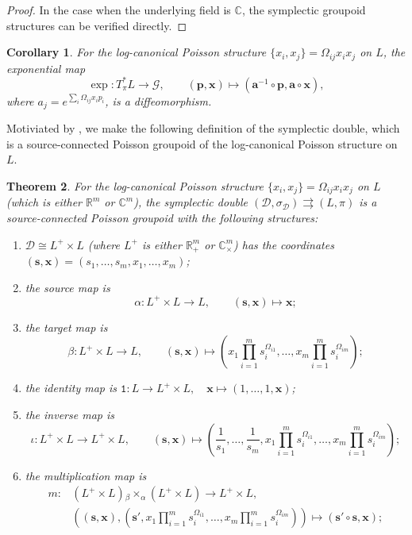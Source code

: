 \documentclass{amsart}
\newtheorem{theorem}{Theorem}[section]
\newtheorem{corollary}[theorem]{Corollary}
\numberwithin{equation}{section}
\newcommand{\bfa}{{\boldsymbol{a}}}
\newcommand{\bfp}{{\boldsymbol{p}}}
\newcommand{\bfs}{{\boldsymbol{s}}}
\newcommand{\bfx}{{\boldsymbol{x}}}
\newcommand{\cD}{\mathcal{D}}
\newcommand{\cG}{\mathcal{G}}
\newcommand{\CC}{\mathbb{C}}
\newcommand{\RR}{\mathbb{R}}
\newcommand{\rra}{\rightrightarrows}
\begin{document}
\begin{proof}
  In the case when the underlying field is $\CC$, the symplectic groupoid structures can be verified directly.
\end{proof}

\begin{corollary}
  For the log-canonical Poisson structure $\{x_i, x_j\} = \Omega_{ij} x_i x_j$ on $L$, the exponential map
  \[\exp: T^*_\pi L \to \cG, \qquad (\bfp, \bfx) \mapsto \left(\bfa^{-1} \circ \bfp, \bfa \circ \bfx \right),\]
  where $a_j = e^{\sum_i \Omega_{ij} x_ip_i}$, is a diffeomorphism.
\end{corollary}

Motiviated by \cite{FG09c}, we make the following definition of the symplectic double, which is a source-connected Poisson groupoid of the log-canonical Poisson structure on $L$.
\begin{theorem} \label{thm:SymDBLoc}
  \cite{FG09c}
  For the log-canonical Poisson structure $\{x_i, x_j\} = \Omega_{ij} x_i x_j$ on $L$ (which is either $\RR^m$ or $\CC^m$), the \emph{symplectic double} $(\cD, \sigma_\cD) \rra (L, \pi)$ is a source-connected Poisson groupoid with the following structures:
  \begin{enumerate}
    \item $\cD \cong L^+ \times L$ (where $L^+$ is either $\RR_+^m$ or $\CC_\times^m$) has the coordinates $(\bfs, \bfx) = (s_1, \ldots, s_m, x_1, \ldots, x_m)$;
    \item the source map is
      \[\alpha: L^+ \times L \to L, \qquad (\bfs, \bfx) \mapsto \bfx;\]
    \item the target map is
      \[\beta: L^+ \times L \to L, \qquad (\bfs, \bfx) \mapsto \left(x_1 \prod_{i=1}^m s_i^{\Omega_{i1}}, \ldots, x_m \prod_{i=1}^m s_i^{\Omega_{im}}\right);\]
    \item the identity map is $\mathtt{1}: L \to L^+ \times L, \quad \bfx \mapsto (1, \ldots, 1, \bfx)$;
    \item the inverse map is
      \[\iota: L^+ \times L \to L^+ \times L, \qquad (\bfs, \bfx) \mapsto \left(\frac{1}{s_1}, \ldots, \frac{1}{s_m}, x_1 \prod_{i=1}^m s_i^{\Omega_{i1}}, \ldots, x_m \prod_{i=1}^m s_i^{\Omega_{im}}\right);\]
    \item the multiplication map is
      \[\begin{aligned}
	  m: & \left(L^+ \times L\right) {_\beta \times_\alpha} \left(L^+ \times L\right) \to L^+ \times L, \\
	     & \left((\bfs, \bfx), \left(\bfs', x_1 \prod_{i=1}^m s_i^{\Omega_{i1}}, \ldots, x_m \prod_{i=1}^m s_i^{\Omega_{im}}\right)\right) \mapsto (\bfs' \circ \bfs, \bfx );

\end{aligned}\]
\end{enumerate}
\end{theorem}
\end{document}
